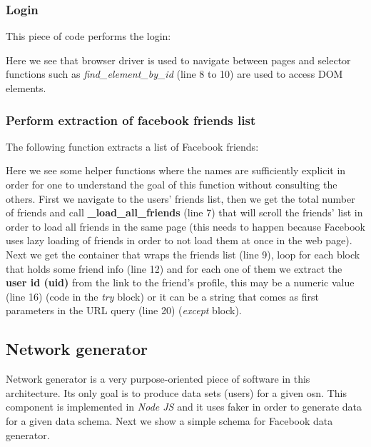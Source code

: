 \subsubsection*{Login}
This piece of code performs the login:



Here we see that browser driver is used to navigate between pages and selector functions such as \textit{find\_element\_by\_id} (line 8 to 10) are used to access DOM elements.

\subsubsection*{Perform extraction of facebook friends list}
The following function extracts a list of Facebook friends:



Here we see some helper functions where the names are sufficiently explicit in order for one to understand the goal of this function without consulting the others. First we navigate to the users' friends list, then we get the total number of friends and call \textbf{\_load\_all\_friends} (line 7) that will scroll the friends' list in order to load all friends in the same page (this needs to happen because Facebook uses lazy loading of friends in order to not load them at once in the web page). Next we get the container that wraps the friends list (line 9), loop for each block that holds some friend info (line 12) and for each one of them we extract the \textbf{user id (uid)} from the link to the friend's profile, this may be a numeric value (line 16) (code in the \textit{try} block) or it can be a string that comes as first parameters in the URL query (line 20) (\textit{except} block).

\subsection{Network generator}

Network generator is a very purpose-oriented piece of software in this architecture. Its only goal is to produce data sets (users) for a given \gls{osn}. This component is implemented in \textit{Node JS} and it uses faker \citep{fakerjs} in order to generate data for a given data schema. Next we show a simple schema for Facebook data generator.



